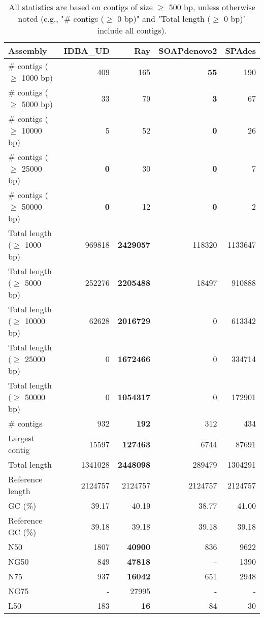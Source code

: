 \documentclass[12pt,a4paper]{article}
\begin{document}
\begin{table}[ht]
\begin{center}
\caption{All statistics are based on contigs of size $\geq$ 500 bp, unless otherwise noted (e.g., "\# contigs ($\geq$ 0 bp)" and "Total length ($\geq$ 0 bp)" include all contigs).}
\begin{tabular}{|l*{4}{|r}|}
\hline
Assembly & IDBA\_UD & Ray & SOAPdenovo2 & SPAdes \\ \hline
\# contigs ($\geq$ 1000 bp) & 409 & 165 & {\bf 55} & 190 \\ \hline
\# contigs ($\geq$ 5000 bp) & 33 & 79 & {\bf 3} & 67 \\ \hline
\# contigs ($\geq$ 10000 bp) & 5 & 52 & {\bf 0} & 26 \\ \hline
\# contigs ($\geq$ 25000 bp) & {\bf 0} & 30 & {\bf 0} & 7 \\ \hline
\# contigs ($\geq$ 50000 bp) & {\bf 0} & 12 & {\bf 0} & 2 \\ \hline
Total length ($\geq$ 1000 bp) & 969818 & {\bf 2429057} & 118320 & 1133647 \\ \hline
Total length ($\geq$ 5000 bp) & 252276 & {\bf 2205488} & 18497 & 910888 \\ \hline
Total length ($\geq$ 10000 bp) & 62628 & {\bf 2016729} & 0 & 613342 \\ \hline
Total length ($\geq$ 25000 bp) & 0 & {\bf 1672466} & 0 & 334714 \\ \hline
Total length ($\geq$ 50000 bp) & 0 & {\bf 1054317} & 0 & 172901 \\ \hline
\# contigs & 932 & {\bf 192} & 312 & 434 \\ \hline
Largest contig & 15597 & {\bf 127463} & 6744 & 87691 \\ \hline
Total length & 1341028 & {\bf 2448098} & 289479 & 1304291 \\ \hline
Reference length & 2124757 & 2124757 & 2124757 & 2124757 \\ \hline
GC (\%) & 39.17 & 40.19 & 38.77 & 41.00 \\ \hline
Reference GC (\%) & 39.18 & 39.18 & 39.18 & 39.18 \\ \hline
N50 & 1807 & {\bf 40900} & 836 & 9622 \\ \hline
NG50 & 849 & {\bf 47818} & - & 1390 \\ \hline
N75 & 937 & {\bf 16042} & 651 & 2948 \\ \hline
NG75 & - & 27995 & - & - \\ \hline
L50 & 183 & {\bf 16} & 84 & 30 \\ \hline

\end{tabular}
\end{center}
\end{table}
\end{document}
